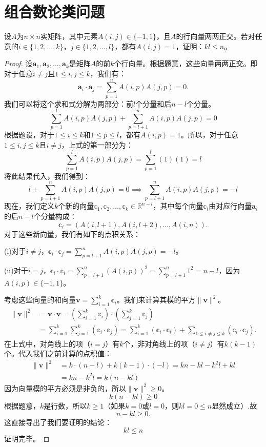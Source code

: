 \documentclass[../../main.tex]{subfiles}%
\begin{document}
\section{组合数论类问题}

\begin{example}
设$A$为$n \times n$实矩阵，其中元素$A(i,j) \in \{-1,1\}$，且$A$的行向量两两正交。若对任意的$i \in \{1,2,\ldots,k\}$，$j \in \{1,2,\ldots,l\}$，都有$A(i,j) = 1$，证明：$kl \leqslant n$。
\end{example}
\begin{proof}

设$\mathbf{a}_1, \mathbf{a}_2, \ldots, \mathbf{a}_k$是矩阵$A$的前$k$个行向量。根据题意，这些向量两两正交。即对于任意$i \neq j$且$1 \leqslant i, j \leqslant k$，我们有：
\[
\mathbf{a}_i \cdot \mathbf{a}_j = \sum_{p=1}^n A(i, p)A(j, p) = 0.
\]
我们可以将这个求和式分解为两部分：前$l$个分量和后$n - l$个分量。
\[
\sum_{p=1}^l A(i, p)A(j, p) + \sum_{p=l+1}^n A(i, p)A(j, p) = 0 
\]
根据题设，对于$1 \leqslant i \leqslant k$和$1 \leqslant p \leqslant l$，都有$A(i, p) = 1$。所以，对于任意$1 \leqslant i, j \leqslant k$且$i \neq j$，上式的第一部分为：
\[
\sum_{p=1}^l A(i, p)A(j, p) = \sum_{p=1}^l (1)(1) = l 
\]
将此结果代入，我们得到：
\[
l + \sum_{p=l+1}^n A(i, p)A(j, p) = 0 \implies \sum_{p=l+1}^n A(i, p)A(j, p) = -l 
\]
现在，我们定义$k$个新的向量$\mathbb{c}_1, \mathbb{c}_2, \ldots, \mathbb{c}_k \in \mathbb{R}^{n - l}$，其中每个向量$\mathbb{c}_i$由对应行向量$\mathbf{a}_i$的后$n - l$个分量构成：
\[
\mathbb{c}_i = (A(i, l + 1), A(i, l + 2), \ldots, A(i, n)).
\]
对于这些新向量，我们有如下的点积关系：

(i)对于$i \neq j$，$\mathbb{c}_i \cdot \mathbb{c}_j = \sum_{p=l+1}^n A(i, p)A(j, p) = -l$。

(ii)对于$i = j$，$\mathbb{c}_i \cdot \mathbb{c}_i = \sum_{p=l+1}^n (A(i, p))^2 = \sum_{p=l+1}^n 1^2 = n - l$，因为$A(i, p) \in \{-1, 1\}$。

考虑这些向量的和向量$\mathbf{v} = \sum_{i=1}^k \mathbb{c}_i$。我们来计算其模的平方$\|\mathbf{v}\|^2$。
\begin{align*}
\|\mathbf{v}\|^2 &= \mathbf{v} \cdot \mathbf{v} = \left( \sum_{i=1}^k \mathbb{c}_i \right) \cdot \left( \sum_{j=1}^k \mathbb{c}_j \right) \\
&= \sum_{i=1}^k \sum_{j=1}^k (\mathbb{c}_i \cdot \mathbb{c}_j)= \sum_{i=1}^k (\mathbb{c}_i \cdot \mathbb{c}_i) + \sum_{1 \leqslant i \neq j \leqslant k} (\mathbb{c}_i \cdot \mathbb{c}_j).
\end{align*}
在上式中，对角线上的项（$i = j$）有$k$个，非对角线上的项（$i \neq j$）有$k(k - 1)$个。代入我们之前计算的点积值：
\begin{align*}
\|\mathbf{v}\|^2 &= k \cdot (n - l) + k(k - 1) \cdot (-l) = kn - kl - k^2 l + kl \\
&= kn - k^2 l = k(n - kl)
\end{align*}
因为向量模的平方必须是非负的，所以$\|\mathbf{v}\|^2 \geqslant 0$。
\[
k(n - kl) \geqslant 0
\]
根据题意，$k$是行数，所以$k \geqslant 1$（如果$k = 0$或$l = 0$，则$kl = 0 \leqslant n$显然成立）.故
\[
n - kl \geqslant 0.
\]
这直接导出了我们要证明的结论：
\[
kl \leqslant n
\]
证明完毕。

\end{proof}
\end{document}
